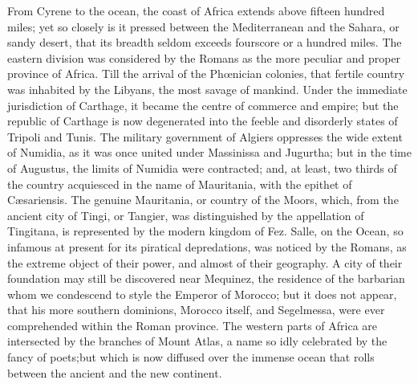 From Cyrene to the ocean, the coast of Africa extends above
fifteen hundred miles; yet so closely is it pressed between the
Mediterranean and the Sahara, or sandy desert, that its breadth
seldom exceeds fourscore or a hundred miles. The eastern division
was considered by the Romans as the more peculiar and proper
province of Africa. Till the arrival of the Phœnician colonies,
that fertile country was inhabited by the Libyans, the most
savage of mankind. Under the immediate jurisdiction of Carthage,
it became the centre of commerce and empire; but the republic of
Carthage is now degenerated into the feeble and disorderly states
of Tripoli and Tunis. The military government of Algiers
oppresses the wide extent of Numidia, as it was once united under
Massinissa and Jugurtha; but in the time of Augustus, the limits
of Numidia were contracted; and, at least, two thirds of the
country acquiesced in the name of Mauritania, with the epithet of
Cæsariensis. The genuine Mauritania, or country of the Moors,
which, from the ancient city of Tingi, or Tangier, was
distinguished by the appellation of Tingitana, is represented by
the modern kingdom of Fez. Salle, on the Ocean, so infamous at
present for its piratical depredations, was noticed by the
Romans, as the extreme object of their power, and almost of their
geography. A city of their foundation may still be discovered
near Mequinez, the residence of the barbarian whom we condescend
to style the Emperor of Morocco; but it does not appear, that his
more southern dominions, Morocco itself, and Segelmessa, were
ever comprehended within the Roman province. The western parts of
Africa are intersected by the branches of Mount Atlas, a name so
idly celebrated by the fancy of poets;\footnotemark[86] but which is now
diffused over the immense ocean that rolls between the ancient
and the new continent.\footnotemark[87]



